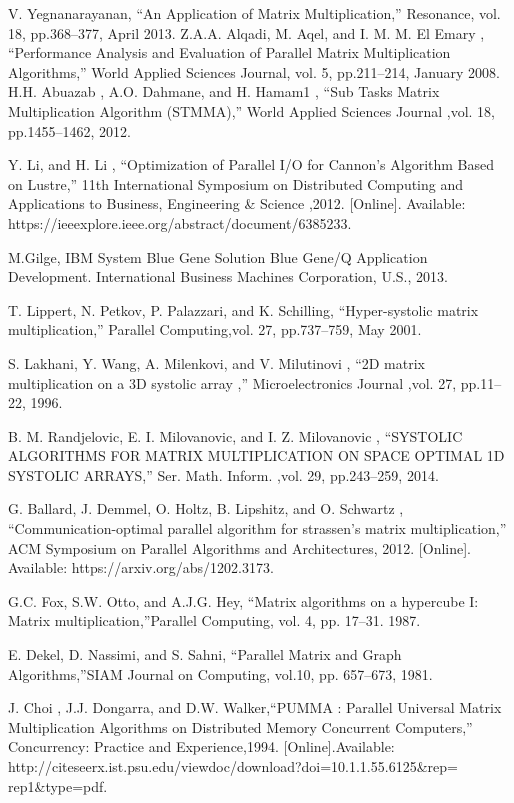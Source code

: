 \documentclass[conference]{IEEEtran}
\begin{document}
\begin{thebibliography}{00}
 V. Yegnanarayanan, ``An Application of Matrix Multiplication,'' Resonance, vol. 18, pp.368--377, April 2013.
  Z.A.A. Alqadi, M. Aqel, and I. M. M. El Emary , ``Performance Analysis and Evaluation of Parallel Matrix Multiplication Algorithms,'' World Applied Sciences Journal, vol. 5, pp.211--214, January 2008.
 H.H. Abuazab , A.O. Dahmane, and H. Hamam1 , ``Sub Tasks Matrix Multiplication Algorithm (STMMA),'' World Applied Sciences Journal ,vol. 18, pp.1455--1462, 2012.

 Y. Li, and H. Li , ``Optimization of Parallel I/O for Cannon's Algorithm Based on Lustre,'' 11th International Symposium on Distributed Computing and Applications to Business, Engineering \& Science ,2012. [Online].  Available: https://ieeexplore.ieee.org/abstract/document/6385233.

 M.Gilge, IBM System Blue Gene Solution Blue Gene/Q Application Development. International Business Machines Corporation, U.S., 2013.


 T. Lippert, N. Petkov, P. Palazzari, and K. Schilling, ``Hyper-systolic matrix multiplication,'' Parallel Computing,vol. 27, pp.737--759, May 2001.

 S. Lakhani, Y. Wang, A. Milenkovi, and V. Milutinovi , ``2D matrix
multiplication on a 3D systolic array ,'' Microelectronics Journal ,vol. 27, pp.11--22, 1996.


 B. M. Randjelovic, E. I. Milovanovic, and I. Z. Milovanovic , ``SYSTOLIC ALGORITHMS FOR MATRIX MULTIPLICATION ON SPACE OPTIMAL 1D SYSTOLIC ARRAYS,'' Ser. Math. Inform. ,vol. 29, pp.243--259, 2014.


  G. Ballard, J. Demmel, O. Holtz, B. Lipshitz, and O. Schwartz , ``Communication-optimal parallel algorithm for strassen's matrix multiplication,'' ACM Symposium on Parallel Algorithms and Architectures, 2012. [Online].  Available: https://arxiv.org/abs/1202.3173.

 G.C. Fox, S.W. Otto, and A.J.G. Hey, ``Matrix algorithms on a hypercube I: Matrix multiplication,''Parallel Computing, vol. 4, pp. 17--31. 1987.


 E. Dekel, D. Nassimi, and S. Sahni, ``Parallel Matrix and Graph Algorithms,''SIAM Journal on Computing, vol.10, pp. 657--673, 1981. 

 J. Choi , J.J. Dongarra, and D.W. Walker,``PUMMA : Parallel Universal Matrix Multiplication Algorithms on Distributed Memory Concurrent Computers,'' Concurrency: Practice and Experience,1994. [Online].Available: http://citeseerx.ist.psu.edu/viewdoc/download?doi=10.1.1.55.6125\&rep=\\rep1\&type=pdf.


\end{thebibliography}
\end{document}
